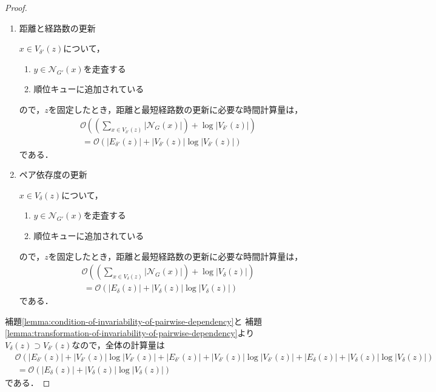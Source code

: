 \begin{proof}
\begin{enumerate}[label=(\alph*)]
  \item 距離と経路数の更新
    \par $x\in V_{\delta'}(z)$について，
    \begin{enumerate}[label=\arabic*.]
    \item $y\in\mathcal{N}_{G'}(x)$を走査する
    \item 順位キューに追加されている
    \end{enumerate}
    ので，$z$を固定したとき，距離と最短経路数の更新に必要な時間計算量は，
    \begin{equation}
      \begin{aligned}
        &\mathcal{O}(\left(\sum_{x\in V_{\delta'}(z)}\lvert\mathcal{N}_G(x)\rvert\right)
        +\log\lvert V_{\delta'}(z)\rvert) \nonumber\\
        &\:=\mathcal{O}(\lvert E_{\delta'}(z)\rvert
        +\lvert V_{\delta'}(z)\rvert\log\lvert V_{\delta'}(z)\rvert) \nonumber
      \end{aligned}
    \end{equation}
    である．

  \item ペア依存度の更新
    \par $x\in V_\delta(z)$について，
    \begin{enumerate}[label=\arabic*.]
    \item $y\in\mathcal{N}_{G'}(x)$を走査する
    \item 順位キューに追加されている
    \end{enumerate}
    ので，$z$を固定したとき，距離と最短経路数の更新に必要な時間計算量は，
    \begin{equation}
      \begin{aligned}
        &\mathcal{O}(\left(\sum_{x\in V_\delta(z)}\lvert\mathcal{N}_G(x)\rvert\right)
        +\log\lvert V_\delta(z)\rvert) \nonumber\\
        &\:=\mathcal{O}(\lvert E_\delta(z)\rvert
        +\lvert V_\delta(z)\rvert\log\lvert V_\delta(z)\rvert) \nonumber
      \end{aligned}
    \end{equation}
    である．
  \end{enumerate}
  
  補題\ref{lemma:condition-of-invariability-of-pairwise-dependency}と
  補題\ref{lemma:transformation-of-invariability-of-pairwise-dependency}より
  $V_\delta(z)\supset V_{\delta'}(z)$なので，全体の計算量は
  \begin{equation*}
    \begin{aligned}
      &\mathcal{O}(
        \lvert E_{\delta'}(z)\rvert+\lvert V_{\delta'}(z)\rvert\log\lvert V_{\delta'}(z)\rvert
        +\lvert E_{\delta'}(z)\rvert+\lvert V_{\delta'}(z)\rvert\log\lvert V_{\delta'}(z)\rvert
        +\lvert E_\delta(z)\rvert+\lvert V_\delta(z)\rvert\log\lvert V_\delta(z)\rvert
      ) \nonumber\\
      &\:=\mathcal{O}(\lvert E_\delta(z)\rvert+\lvert V_\delta(z)\rvert\log\lvert V_\delta(z)\rvert)
    \end{aligned}
  \end{equation*}
  である．


\end{proof}
